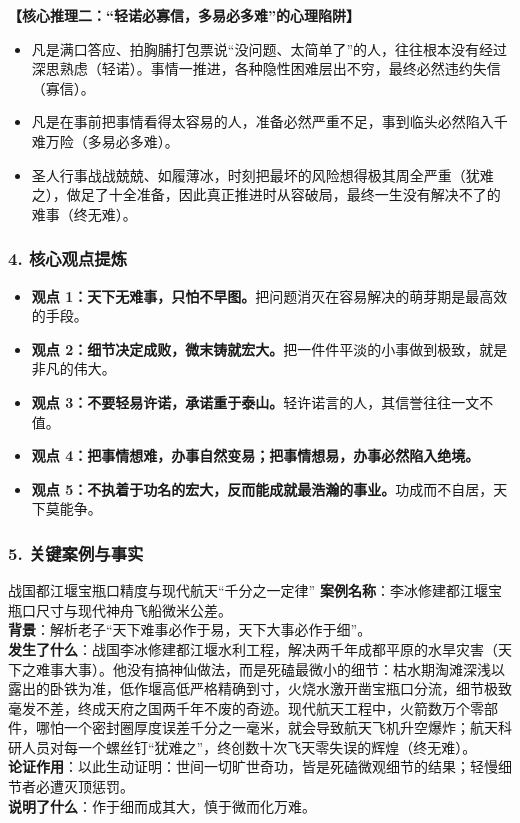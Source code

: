 \noindent\textbf{【核心推理二：“轻诺必寡信，多易必多难”的心理陷阱】}
\begin{itemize}
    \item 凡是满口答应、拍胸脯打包票说“没问题、太简单了”的人，往往根本没有经过深思熟虑（轻诺）。事情一推进，各种隐性困难层出不穷，最终必然违约失信（寡信）。
    \item 凡是在事前把事情看得太容易的人，准备必然严重不足，事到临头必然陷入千难万险（多易必多难）。
    \item 圣人行事战战兢兢、如履薄冰，时刻把最坏的风险想得极其周全严重（犹难之），做足了十全准备，因此真正推进时从容破局，最终一生没有解决不了的难事（终无难）。
\end{itemize}

\subsubsection{4. 核心观点提炼}
\begin{itemize}
    \item \textbf{观点 1：天下无难事，只怕不早图。}把问题消灭在容易解决的萌芽期是最高效的手段。
    \item \textbf{观点 2：细节决定成败，微末铸就宏大。}把一件件平淡的小事做到极致，就是非凡的伟大。
    \item \textbf{观点 3：不要轻易许诺，承诺重于泰山。}轻许诺言的人，其信誉往往一文不值。
    \item \textbf{观点 4：把事情想难，办事自然变易；把事情想易，办事必然陷入绝境。}
    \item \textbf{观点 5：不执着于功名的宏大，反而能成就最浩瀚的事业。}功成而不自居，天下莫能争。
\end{itemize}

\subsubsection{5. 关键案例与事实}
\begin{CaseBox}{战国都江堰宝瓶口精度与现代航天“千分之一定律”}
\textbf{案例名称}：李冰修建都江堰宝瓶口尺寸与现代神舟飞船微米公差。\\
\textbf{背景}：解析老子“天下难事必作于易，天下大事必作于细”。\\
\textbf{发生了什么}：战国李冰修建都江堰水利工程，解决两千年成都平原的水旱灾害（天下之难事大事）。他没有搞神仙做法，而是死磕最微小的细节：枯水期淘滩深浅以露出的卧铁为准，低作堰高低严格精确到寸，火烧水激开凿宝瓶口分流，细节极致毫发不差，终成天府之国两千年不废的奇迹。现代航天工程中，火箭数万个零部件，哪怕一个密封圈厚度误差千分之一毫米，就会导致航天飞机升空爆炸；航天科研人员对每一个螺丝钉“犹难之”，终创数十次飞天零失误的辉煌（终无难）。\\
\textbf{论证作用}：以此生动证明：世间一切旷世奇功，皆是死磕微观细节的结果；轻慢细节者必遭灭顶惩罚。\\
\textbf{说明了什么}：作于细而成其大，慎于微而化万难。
\end{CaseBox}

